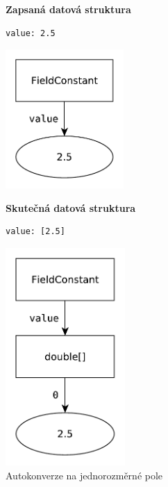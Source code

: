 \documentclass[FM,bw,DP]{tulthesis}
\begin{document}
\begin{figure}[ht]
\begin{minipage}[t]{0.45\linewidth}
\vspace{0pt}
\textbf{Zapsaná datová struktura}\\
\vspace{-5pt}
\begin{lstlisting}
value: 2.5
\end{lstlisting}
\vspace*{-20pt}
\begin{center}
\includegraphics[height=150pt]{../img/autoconversion_array_1_before.pdf}
\end{center}
\end{minipage}
\quad
\begin{minipage}[t]{0.45\linewidth}
\vspace{0pt}
\textbf{Skutečná datová struktura}\\
\vspace{-5pt}
\begin{lstlisting}
value: [2.5]
\end{lstlisting}
\vspace*{-20pt}
\begin{center}
\includegraphics[height=235pt]{../img/autoconversion_array_1_after.pdf}
\end{center}
\end{minipage}
\caption{Autokonverze na jednorozměrné pole}
\label{img:autoconversion_array_1}
\end{figure}	
\end{document}
